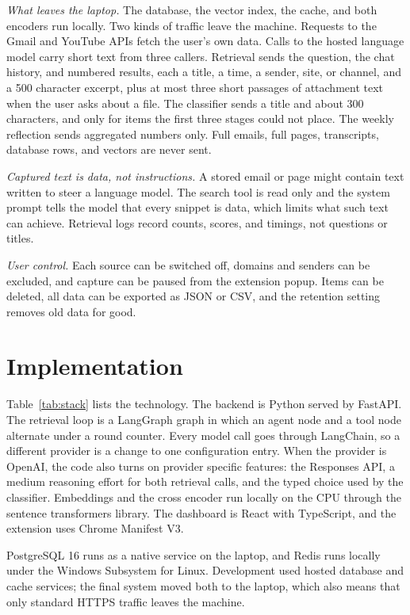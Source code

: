 \documentclass[conference]{IEEEtran}
\begin{document}
\textit{What leaves the laptop.} The database, the vector index, the cache, and both encoders run locally. Two kinds of traffic leave the machine. Requests to the Gmail and YouTube APIs fetch the user's own data. Calls to the hosted language model carry short text from three callers. Retrieval sends the question, the chat history, and numbered results, each a title, a time, a sender, site, or channel, and a 500 character excerpt, plus at most three short passages of attachment text when the user asks about a file. The classifier sends a title and about 300 characters, and only for items the first three stages could not place. The weekly reflection sends aggregated numbers only. Full emails, full pages, transcripts, database rows, and vectors are never sent.

\textit{Captured text is data, not instructions.} A stored email or page might contain text written to steer a language model. The search tool is read only and the system prompt tells the model that every snippet is data, which limits what such text can achieve. Retrieval logs record counts, scores, and timings, not questions or titles.

\textit{User control.} Each source can be switched off, domains and senders can be excluded, and capture can be paused from the extension popup. Items can be deleted, all data can be exported as JSON or CSV, and the retention setting removes old data for good.

\section{Implementation}\label{sec:impl}
Table~\ref{tab:stack} lists the technology. The backend is Python served by FastAPI. The retrieval loop is a LangGraph graph \cite{b5} in which an agent node and a tool node alternate under a round counter. Every model call goes through LangChain, so a different provider is a change to one configuration entry. When the provider is OpenAI, the code also turns on provider specific features: the Responses API, a medium reasoning effort for both retrieval calls, and the typed choice used by the classifier. Embeddings and the cross encoder run locally on the CPU through the sentence transformers library. The dashboard is React with TypeScript, and the extension uses Chrome Manifest V3.

PostgreSQL 16 runs as a native service on the laptop, and Redis runs locally under the Windows Subsystem for Linux. Development used hosted database and cache services; the final system moved both to the laptop, which also means that only standard HTTPS traffic leaves the machine.
\end{document}
